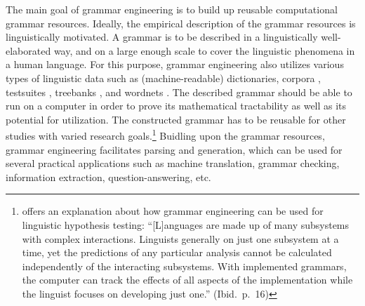 The main goal of grammar engineering is to build up reusable
computational grammar resources. Ideally, the
empirical description of the grammar resources is linguistically
motivated. A grammar is to be described in a linguistically
well-elaborated way, and on a large enough scale to cover the
linguistic phenomena in a human language.  For this purpose, grammar
engineering also utilizes various types of linguistic data such as
(machine-readable) dictionaries, corpora
\citep{nichols:etal:10,song:etal:10}, testsuites \citep{oepen:01},
treebanks \citep{oepen:etal:04,bond:etal:06}, and wordnets
\citep{bond:etal:09,pozen:13}.  The described grammar should be able
to run on a computer in order to prove its mathematical tractability
as well as its potential for utilization. The constructed grammar has
to be reusable for other studies with varied research
goals.\footnote{\citet{bender:08} offers an explanation about how
  grammar engineering can be used for linguistic hypothesis testing:
  ``[L]anguages are made up of many subsystems with complex
  interactions. Linguists generally  on just one subsystem at a
  time, yet the predictions of any particular analysis cannot be
  calculated independently of the interacting subsystems. With
  implemented grammars, the computer can track the effects of all
  aspects of the implementation while the linguist focuses on
  developing just one.'' (Ibid.\ p.\ 16)} Buidling upon the grammar
resources, grammar engineering facilitates parsing and generation,
which can be used for several practical applications such as machine
translation, grammar checking, information extraction,
question-answering, etc.




